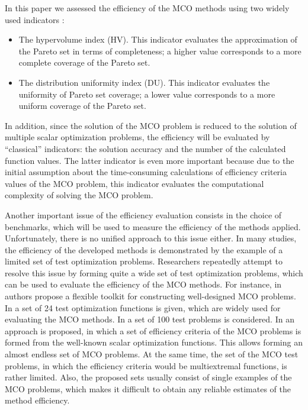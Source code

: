 \documentclass[smallextended]{svjour3}       %
\begin{document}
In this paper we assessed the efficiency of the MCO methods using two widely used indicators \cite{c35,c36}:
\begin{itemize}
	\item The hypervolume index (HV). This indicator evaluates the approximation of the Pareto set in terms of completeness; a higher value corresponds to a more complete coverage of the Pareto set.
	\item The distribution uniformity index (DU). This indicator evaluates the uniformity of Pareto set coverage; a lower value corresponds to a more uniform coverage of the Pareto set.
\end{itemize}

In addition, since the solution of the MCO problem is reduced to the solution of multiple scalar optimization problems, the efficiency will be evaluated by ``classical'' indicators: the solution accuracy and the number of the calculated function values. The latter indicator is even more important because due to the initial assumption about the time-consuming calculations of efficiency criteria values of the MCO problem, this indicator evaluates the computational complexity of solving the MCO problem.

Another important issue of the efficiency evaluation consists in the choice of benchmarks, which will be used to measure the efficiency of the methods applied. Unfortunately, there is no unified approach to this issue either. In many studies, the efficiency of the developed methods is demonstrated by the example of a limited set of test optimization problems. Researchers repeatedly attempt to resolve this issue by forming quite a wide set of test optimization problems, which can be used to evaluate the efficiency of the MCO methods. For instance, in \cite{c53} authors propose a flexible toolkit for constructing well-designed MCO problems. In \cite{c54} a set of 24 test optimization functions is given, which are widely used for evaluating the MCO methods. In \cite{c55} a set of 100 test problems is considered. In \cite{c56} an approach is proposed, in which a set of efficiency criteria of the MCO problems is formed from the well-known scalar optimization functions. This allows forming an almost endless set of MCO problems. At the same time, the set of the MCO test problems, in which the efficiency criteria would be multiextremal functions, is rather limited. Also, the proposed sets usually consist of single examples of the MCO problems, which makes it difficult to obtain any reliable estimates of the method efficiency. 
\end{document}
